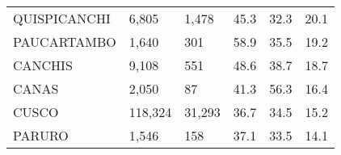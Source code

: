 \begin{tabular}{llllll}
	\cellcolor[HTML]{FF5050}QUISPICANCHI                           & 6,805                                                                 & 1,478                                                            & 45.3                                                                             & 32.3                                                                        & 20.1                                                                                \\
	\cellcolor[HTML]{FF5050}PAUCARTAMBO                            & 1,640                                                                 & 301                                                              & 58.9                                                                             & 35.5                                                                        & 19.2                                                                                \\
	\cellcolor[HTML]{FF5050}CANCHIS                                & 9,108                                                                 & 551                                                              & 48.6                                                                             & 38.7                                                                        & 18.7                                                                                \\
	\cellcolor[HTML]{FF5050}CANAS                                  & 2,050                                                                 & 87                                                               & 41.3                                                                             & 56.3                                                                        & 16.4                                                                                \\
	\cellcolor[HTML]{F8CBAD}CUSCO                                  & 118,324                                                               & 31,293                                                           & 36.7                                                                             & 34.5                                                                        & 15.2                                                                                \\
	\cellcolor[HTML]{F8CBAD}PARURO                                 & 1,546                                                                 & 158                                                              & 37.1                                                                             & 33.5                                                                        & 14.1                                                                                \\

\end{tabular}
